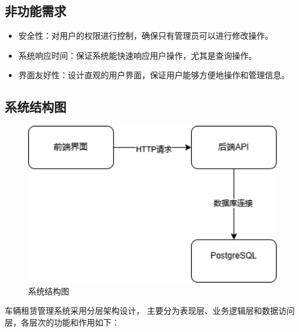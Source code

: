 \documentclass[UTF8,a4paper,12pt]{ctexart}
\begin{document}
\subsection{非功能需求}

\begin{itemize}
    \item 安全性：对用户的权限进行控制，确保只有管理员可以进行修改操作。
    \item 系统响应时间：保证系统能快速响应用户操作，尤其是查询操作。
    \item 界面友好性：设计直观的用户界面，保证用户能够方便地操作和管理信息。
\end{itemize}

\subsection{系统结构图}

\begin{figure}[htbp]  %
    \centering  %
    \includegraphics[width=1\textwidth]{pic/sap.png}  %
    \caption{系统结构图}  %
    \label{fig:sap}  %
\end{figure}

车辆租赁管理系统采用分层架构设计，
主要分为表现层、业务逻辑层和数据访问层，各层次的功能和作用如下：
\end{document}
